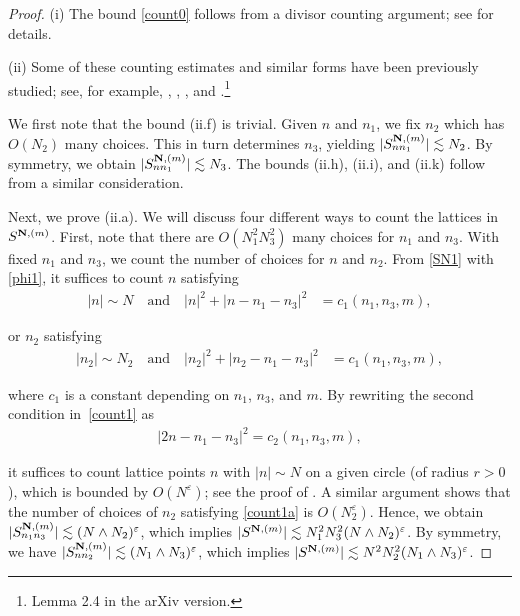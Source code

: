 \documentclass[%
11pt,  reqno]{amsart}
\newcommand{\1}{\hspace{0.2mm}\text{I}\hspace{0.2mm}}
\newcommand{\noi}{\noindent}
\newcommand{\eps}{\varepsilon}
\newcommand{\les}{\lesssim}
\newcommand{\ges}{\gtrsim}
\numberwithin{equation}{section}
\numberwithin{theorem}{section}
\begin{document}
\begin{proof} %
(i) The bound \eqref{count0}
follows from a divisor counting argument; see \cite[Lemma~4.4]{DNY2} 
for details.

\smallskip

\noi
(ii)
Some of these counting estimates and similar forms have been previously studied;
see, for example, \cite[Lemmas 1 and 2]{BO96}, 
\cite[Section 4]{FOSW}, 
\cite[Lemma 4.4]{DNY2}, 
and 
\cite[Lemma 2.5]{DNY4}.\footnote{Lemma 2.4 in the arXiv version.} 


We first note that the bound  (ii.f)
is trivial.
Given  $n$ and $n_1$, 
we fix $n_2$ which has $O(N_2)$ many choices.
This  in turn determines $n_3$,
yielding
$|S^{{\bf N}, (m)}_{nn_1}|\lesssim  N_2$.
By symmetry, we obtain 
$|S^{{\bf N}, (m)}_{nn_1}|\lesssim  N_3$.
The bounds (ii.h), (ii.i), and (ii.k) follow
from a similar consideration.




Next, we prove (ii.a).
We will  discuss four different ways to count the lattices in $S^{{\bf N}, (m)}$.
First, note that 
there are $O(N_1^2 N_3^2)$ many choices for $n_1$ and $n_3$.
With fixed $n_1$ and $n_3$,  
we count the number of choices for $n$ and $n_2$.
From \eqref{SN1} with \eqref{phi1}, 
it suffices to count $n$ satisfying
\begin{align}
|n| \sim N 
\quad \text{and}\quad 
|n|^2 +|n-n_1 -n_3|^2 & =c_1(n_1, n_3, m), 
\label{count1}
\end{align}

\noi
or $n_2$ satisfying
\begin{align}
|n_2|\sim N_2
\quad \text{and}\quad 
|n_2|^2 +|n_2-n_1-n_3|^2 & =c_1(n_1, n_3, m), 
\label{count1a}
\end{align}

\noi
where $c_1$ is a  constant depending on $n_1$, $n_3$, 
and $m$.
By rewriting the second condition in~\eqref{count1} as
\begin{align*}
 |2 n - n_1 -n_3 |^2 = c_2(n_1, n_3, m), 
\end{align*}

\noi
it suffices to count lattice points $n$ with $|n| \sim N$ on a given circle
(of radius $r > 0$), 
which is bounded by $O(N^\eps)$;  
see the proof of \cite[Lemma 1]{BO96}.
A similar argument shows that the number of choices of $n_2$
satisfying \eqref{count1a}
is $O(N_2^\eps)$.
Hence, we obtain
$|S^{{\bf N}, (m)}_{n_1n_3} |\lesssim  (N\wedge N_2)^{\eps}$,
which implies
$|S^{{\bf N}, (m)}|\lesssim N_1^2 N_3^2 (N\wedge N_2)^{\eps}$. 
By symmetry, we have
$|S^{{\bf N}, (m)}_{nn_2} |\lesssim  (N_1\wedge N_3)^{\eps}$,
which implies
$|S^{{\bf N}, (m)}|\les 
N^2 N_2^2 (N_1\wedge  N_3)^{\eps}$. 



\end{proof}
\end{document}
